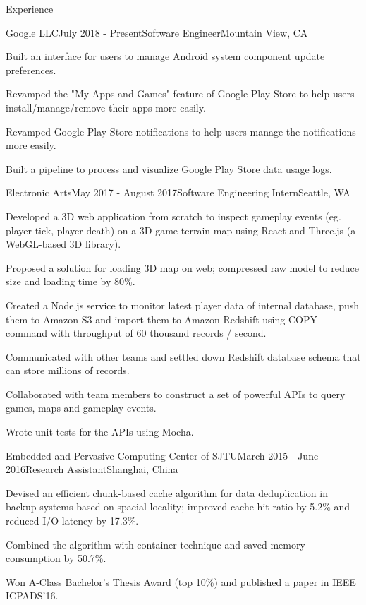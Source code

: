\documentclass{resume} %
\begin{document}

\begin{rSection}{Experience}

\begin{rSubsection}{Google LLC}{July 2018 - Present}{Software Engineer}{Mountain View, CA}
\item Built an interface for users to manage Android system component update preferences.
\item Revamped the "My Apps and Games" feature of Google Play Store to help users install/manage/remove their apps more easily.
\item Revamped Google Play Store notifications to help users manage the notifications more easily.
\item Built a pipeline to process and visualize Google Play Store data usage logs.
\end{rSubsection}

\begin{rSubsection}{Electronic Arts}{May 2017 - August 2017}{Software Engineering Intern}{Seattle, WA}
\item Developed a 3D web application from scratch to inspect gameplay events (eg. player tick, player death) on a 3D game terrain map using React and Three.js (a WebGL-based 3D library).
\item Proposed a solution for loading 3D map on web; compressed raw model to reduce size and loading time by 80\%.
\item Created a Node.js service to monitor latest player data of internal database, push them to Amazon S3 and import them to Amazon Redshift using COPY command with throughput of 60 thousand records / second.
\item Communicated with other teams and settled down Redshift database schema that can store millions of records.
\item Collaborated with team members to construct a set of powerful APIs to query games, maps and gameplay events.
\item Wrote unit tests for the APIs using Mocha.
\end{rSubsection}

\begin{rSubsection}{Embedded and Pervasive Computing Center of SJTU}{March 2015 - June 2016}{Research Assistant}{Shanghai, China}
\item Devised an efficient chunk-based cache algorithm for data deduplication in backup systems based on spacial locality; improved cache hit ratio by 5.2\%  and reduced I/O latency by 17.3\%.
\item Combined the algorithm with container technique and saved memory consumption by 50.7\%.
\item Won A-Class Bachelor's Thesis Award (top 10\%) and published a paper in IEEE ICPADS’16.
\end{rSubsection}


\end{rSection}
\end{document}
